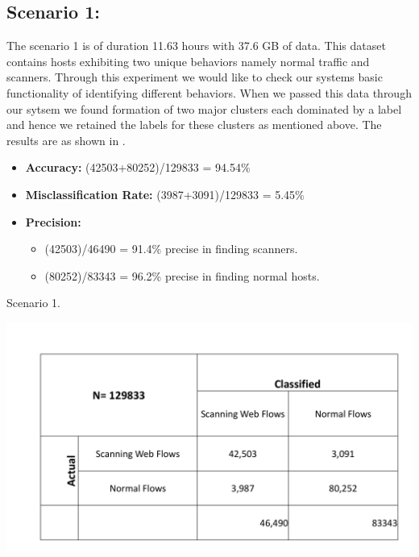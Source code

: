 \subsection{Scenario 1:}
The scenario 1 is of duration 11.63 hours with 37.6 GB of data. This dataset contains hosts exhibiting two unique behaviors namely normal traffic and scanners. Through this experiment we would like to check our systems basic functionality of identifying different behaviors. When we passed this data through our sytsem we found formation of two major clusters each dominated by a label and hence we retained the labels for these clusters as mentioned above. The results are as shown in  . 



\begin{itemize}
	\item \textbf{Accuracy:} (42503+80252)/129833 = 94.54\%
	
	\item \textbf{Misclassification Rate:} (3987+3091)/129833 = 5.45\%
	\item \textbf{Precision:} 
	\begin{itemize}
		
				
		\item (42503)/46490 = 91.4\% precise in finding scanners.
		
		\item (80252)/83343 = 96.2\% precise in finding normal hosts.
			
	\end{itemize}

\end{itemize}
\begin{table}[t]
	\caption{Scenario 1.}%
	\centerline{\includegraphics[scale = 0.5]{scenario1.pdf}}	
\end{table}

